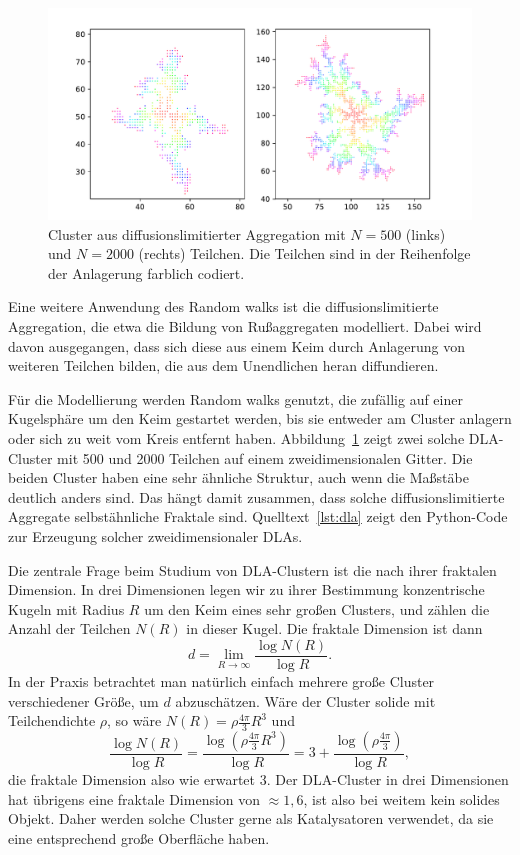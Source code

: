 \begin{figure}
  \centering
  \includegraphics[width=\textwidth]{plots/dla}
  \caption{Cluster aus diffusionslimitierter Aggregation mit $N=500$
    (links) und $N=2000$ (rechts) Teilchen. Die Teilchen sind in der
    Reihenfolge der Anlagerung farblich codiert.}
  \label{fig:dla}
\end{figure}

Eine weitere Anwendung des Random walks ist die diffusionslimitierte
Aggregation, die etwa die Bildung von Rußaggregaten modelliert. Dabei
wird davon ausgegangen, dass sich diese aus einem Keim durch
Anlagerung von weiteren Teilchen bilden, die aus dem Unendlichen heran
diffundieren.

Für die Modellierung werden Random walks genutzt, die zufällig auf
einer Kugelsphäre um den Keim gestartet werden, bis sie entweder am
Cluster anlagern oder sich zu weit vom Kreis entfernt
haben. Abbildung~\ref{fig:dla} zeigt zwei solche DLA-Cluster mit 500
und 2000 Teilchen auf einem zweidimensionalen Gitter. Die beiden
Cluster haben eine sehr ähnliche Struktur, auch wenn die Maßstäbe
deutlich anders sind. Das hängt damit zusammen, dass solche
diffusionslimitierte Aggregate selbstähnliche Fraktale
sind. Quelltext~\ref{lst:dla} zeigt den Python-Code zur Erzeugung
solcher zweidimensionaler DLAs.

Die zentrale Frage beim Studium von DLA-Clustern ist die nach ihrer
fraktalen Dimension. In drei Dimensionen legen wir zu ihrer Bestimmung
konzentrische Kugeln mit Radius $R$ um den Keim eines sehr großen
Clusters, und zählen die Anzahl der Teilchen $N(R)$ in dieser
Kugel. Die fraktale Dimension ist dann
\begin{equation}
  d = \lim_{R\to\infty}\frac{\log N(R)}{\log R}.
\end{equation}
In der Praxis betrachtet man natürlich einfach mehrere große Cluster
verschiedener Größe, um $d$ abzuschätzen.  Wäre der Cluster solide mit
Teilchendichte $\rho$, so wäre $N(R) = \rho \frac{4\pi}{3} R^3$ und
\begin{equation}
  \frac{\log N(R)}{\log R} = \frac{\log\left( \rho
      \frac{4\pi}{3} R^3\right)}{\log R} =
  3 + \frac{\log\left( \rho\frac{4\pi}{3}\right)}{\log R},
\end{equation}
die fraktale Dimension also wie erwartet 3. Der DLA-Cluster in drei
Dimensionen hat übrigens eine fraktale Dimension von $\approx 1,6$,
ist also bei weitem kein solides Objekt. Daher werden solche Cluster
gerne als Katalysatoren verwendet, da sie eine entsprechend große
Oberfläche haben.

